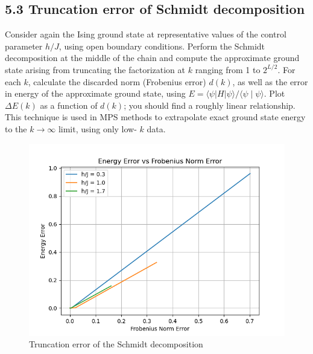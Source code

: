 \documentclass[12pt]{article}
\begin{document}
\subsection*{5.3 Truncation error of Schmidt decomposition}
Consider again the Ising ground state at representative values of the control parameter $h / J$, using open boundary conditions. Perform the Schmidt decomposition at the middle of the chain and compute the approximate ground state arising from truncating the factorization at $k$ ranging from 1 to $2^{L / 2}$. For each $k$, calculate the discarded norm (Frobenius error) $d(k)$, as well as the error in energy of the approximate ground state, using $E=\langle\psi|H| \psi\rangle /\langle\psi \mid \psi\rangle$. Plot $\Delta E(k)$ as a function of $d(k)$; you should find a roughly linear relationship. This technique is used in MPS methods to extrapolate exact ground state energy to the $k \rightarrow \infty$ limit, using only low- $k$ data.
\begin{figure}
\centering
\includegraphics[width=\textwidth]{energy_vs_frobenius.png}
\caption{Truncation error of the Schmidt decomposition}
\end{figure}
\end{document}
